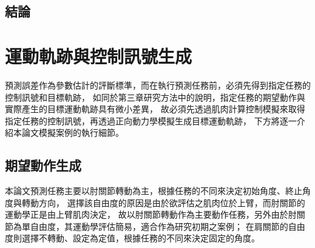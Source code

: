 \begin{table}[!ht]
    \caption[肌肉模型預設參數]{肌肉模型預設參數}
	\label{ch4_table_ModelDefaultParam}
	\centering
\end{table}

\subsection{結論}

\clearpage

\section{運動軌跡與控制訊號生成}
預測誤差作為參數估計的評斷標準，而在執行預測任務前，必須先得到指定任務的控制訊號和目標軌跡，
如同於第三章研究方法中的說明，指定任務的期望動作與實際產生的目標運動軌跡具有微小差異，
故必須先透過肌肉計算控制模擬來取得指定任務的控制訊號，再透過正向動力學模擬生成目標運動軌跡，
下方將逐一介紹本論文模擬案例的執行細節。

\subsection{期望動作生成}
本論文預測任務主要以肘關節轉動為主，根據任務的不同來決定初始角度、終止角度與轉動方向，
選擇該自由度的原因是由於欲評估之肌肉位於上臂，而肘關節的運動學正是由上臂肌肉決定，
故以肘關節轉動作為主要動作任務，另外由於肘關節為單自由度，其運動學評估簡易，適合作為研究初期之案例；
在肩關節的自由度則選擇不轉動、設定為定值，根據任務的不同來決定固定的角度。


